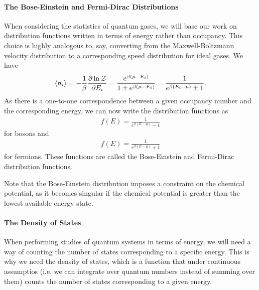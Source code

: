 \paragraph{The Bose-Einstein and Fermi-Dirac Distributions}
When considering the statistics of quantum gases, we will base our work on distribution functions written in terms of energy rather than occupancy. This choice is highly analogous to, say, converting from the Maxwell-Boltzmann velocity distribution to a corresponding speed distribution for ideal gases. We have
\begin{align*}
\expval{n_{i}} = -\frac{1}{\beta}\pdv{\ln{\mathcal{Z}}}{E_{i}} = \frac{e^{\beta(\mu - E_{i})}}{1 \pm e^{\beta(\mu - E_{i})}} = \frac{1}{e^{\beta(E_{i} - \mu)} \pm 1}.
\end{align*}
As there is a one-to-one correspondence between a given occupancy number and the corresponding energy, we can now write the distribution functions as
\begin{align*}
	f(E) = \frac{1}{e^{\beta(E - \mu)} - 1}
\end{align*}
for bosons and
\begin{align*}
	f(E) = \frac{1}{e^{\beta(E - \mu)} + 1}
\end{align*}
for fermions. These functions are called the Bose-Einstein and Fermi-Dirac distribution functions.

Note that the Bose-Einstein distribution imposes a constraint on the chemical potential, as it becomes singular if the chemical potential is greater than the lowest available energy state.

\paragraph{The Density of States}
When performing studies of quantum systems in terms of energy, we will need a way of counting the number of states corresponding to a specific energy. This is why we need the density of states, which is a function that under continuous assumptios (i.e. we can integrate over quantum numbers instead of summing over them) counts the number of states corresponding to a given energy.

